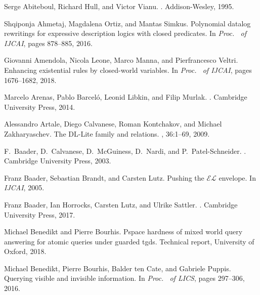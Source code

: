 \documentclass{lmcs}
\theoremstyle{definition}
\begin{document}
\begin{thebibliography}{10}

Serge Abiteboul, Richard Hull, and Victor Vianu.
.
\newblock Addison-Wesley, 1995.

Shqiponja Ahmetaj, Magdalena Ortiz, and Mantas Simkus.
\newblock Polynomial datalog rewritings for expressive description logics with
  closed predicates.
\newblock In {\em Proc. \ of {IJCAI}}, pages 878--885, 2016.

Giovanni Amendola, Nicola Leone, Marco Manna, and Pierfrancesco Veltri.
\newblock Enhancing existential rules by closed-world variables.
\newblock In {\em Proc. \ of {IJCAI}}, pages 1676--1682, 2018.

Marcelo Arenas, Pablo Barcel{\'{o}}, Leonid Libkin, and Filip Murlak.
.
\newblock Cambridge University Press, 2014.

Alessandro Artale, Diego Calvanese, Roman Kontchakov, and Michael
  Zakharyaschev.
\newblock The {D}{L}-{L}ite family and relations.
, 36:1--69, 2009.

F.~Baader, D.~Calvanese, D.~McGuiness, D.~Nardi, and P.~{Patel-Schneider}.
.
\newblock Cambridge University Press, 2003.

Franz Baader, Sebastian Brandt, and Carsten Lutz.
\newblock Pushing the $\mathcal{EL}$ envelope.
\newblock In {\em IJCAI}, 2005.

Franz Baader, Ian Horrocks, Carsten Lutz, and Ulrike Sattler.
.
\newblock Cambridge University Press, 2017.

Michael Benedikt and Pierre Bourhis.
\newblock Pspace hardness of mixed world query answering for atomic queries
  under guarded tgds.
\newblock Technical report, University of Oxford, 2018.

Michael Benedikt, Pierre Bourhis, Balder ten Cate, and Gabriele Puppis.
\newblock Querying visible and invisible information.
\newblock In {\em Proc. \ of {LICS}}, pages 297--306, 2016.


\end{thebibliography}
\end{document}
